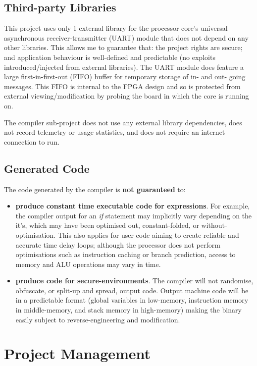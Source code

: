 \documentclass[11pt,a4paper]{report}
\begin{document}
\subsection{Third-party Libraries}
This project uses only 1 external library for the processor core's universal asynchronous receiver-transmitter (UART) module that does not depend on any other libraries. This allows me to guarantee that: the project rights are secure; and application behaviour is well-defined and predictable (no exploits introduced/injected from external libraries). The UART module does feature a large first-in-first-out (FIFO) buffer for temporary storage of in- and out- going messages. This FIFO is internal to the FPGA design and so is protected from external viewing/modification by probing the board in which the core is running on.

The compiler sub-project does not use any external library dependencies, does not record telemetry or usage statistics, and does not require an internet connection to run.

\subsection{Generated Code}
The code generated by the compiler is \textbf{not guaranteed} to:
\begin{itemize}
\item{\textbf{produce constant time executable code for expressions}. For example, the compiler output for an \textit{if} statement may implicitly vary depending on the it's, which may have been optimised out, constant-folded, or without-optimisation. This also applies for user code aiming to create reliable and accurate time delay loops; although the processor does not perform optimisations such as instruction caching or branch prediction, access to memory and ALU operations may vary in time.}
\item{\textbf{produce code for secure-environments}. The compiler will not randomise, obfuscate, or split-up and spread, output code. Output machine code will be in a predictable format (global variables in low-memory, instruction memory in middle-memory, and stack memory in high-memory) making the binary easily subject to reverse-engineering and modification.}
\end{itemize}


\section{Project Management}
\end{document}
